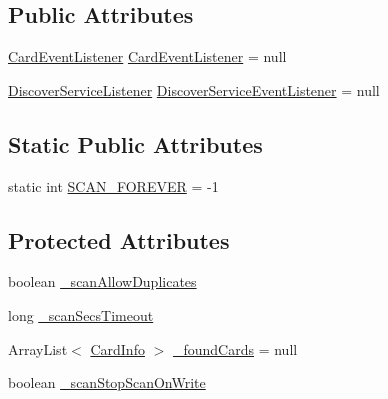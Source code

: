 \subsection*{Public Attributes}
\begin{DoxyCompactItemize}
\item 
\mbox{\hyperlink{classcom_1_1ethernom_1_1android_1_1etherapi_1_1link_layer_1_1_card_event_listener}{Card\+Event\+Listener}} \mbox{\hyperlink{classcom_1_1ethernom_1_1android_1_1etherapi_1_1link_layer_1_1_ether_comm_adapter_aeee26e6999dbf04455b46d44e24819eb}{Card\+Event\+Listener}} = null
\item 
\mbox{\hyperlink{interfacecom_1_1ethernom_1_1android_1_1etherapi_1_1_discover_service_listener}{Discover\+Service\+Listener}} \mbox{\hyperlink{classcom_1_1ethernom_1_1android_1_1etherapi_1_1link_layer_1_1_ether_comm_adapter_a1511b1193c1e6ff04024e76d028df868}{Discover\+Service\+Event\+Listener}} = null
\end{DoxyCompactItemize}
\subsection*{Static Public Attributes}
\begin{DoxyCompactItemize}
\item 
static int \mbox{\hyperlink{classcom_1_1ethernom_1_1android_1_1etherapi_1_1link_layer_1_1_ether_comm_adapter_a385005a3b6b38c91c05d4dfa00ce85a8}{S\+C\+A\+N\+\_\+\+F\+O\+R\+E\+V\+ER}} = -\/1
\end{DoxyCompactItemize}
\subsection*{Protected Attributes}
\begin{DoxyCompactItemize}
\item 
boolean \mbox{\hyperlink{classcom_1_1ethernom_1_1android_1_1etherapi_1_1link_layer_1_1_ether_comm_adapter_a6d602441cd61620f805f75a6c27d6fbb}{\+\_\+scan\+Allow\+Duplicates}}
\item 
long \mbox{\hyperlink{classcom_1_1ethernom_1_1android_1_1etherapi_1_1link_layer_1_1_ether_comm_adapter_aac695bff29f858871ea2479e9408f15f}{\+\_\+scan\+Secs\+Timeout}}
\item 
Array\+List$<$ \mbox{\hyperlink{classcom_1_1ethernom_1_1android_1_1etherapi_1_1_card_info}{Card\+Info}} $>$ \mbox{\hyperlink{classcom_1_1ethernom_1_1android_1_1etherapi_1_1link_layer_1_1_ether_comm_adapter_aa3a6866f74b0d830497e9fbca4878b0d}{\+\_\+found\+Cards}} = null
\item 
boolean \mbox{\hyperlink{classcom_1_1ethernom_1_1android_1_1etherapi_1_1link_layer_1_1_ether_comm_adapter_af89d9c4a8686b6693c21ed2b9eb981fc}{\+\_\+scan\+Stop\+Scan\+On\+Write}}
\end{DoxyCompactItemize}



